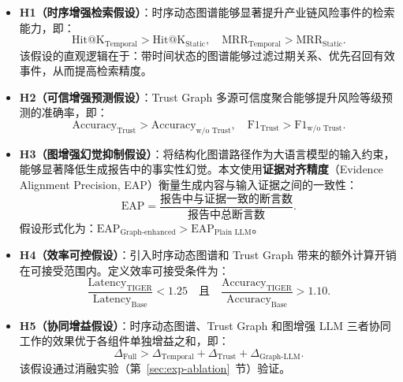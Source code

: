 \documentclass[12pt,a4paper]{article}
\newcommand{\term}[1]{\textbf{#1}}
\begin{document}
\begin{itemize}
    \item \term{H1（时序增强检索假设）}：时序动态图谱能够显著提升产业链风险事件的检索能力，即：
    \begin{equation}
    \text{Hit@K}_{\text{Temporal}} > \text{Hit@K}_{\text{Static}}, \quad \text{MRR}_{\text{Temporal}} > \text{MRR}_{\text{Static}}.
    \end{equation}
    该假设的直观逻辑在于：带时间状态的图谱能够过滤过期关系、优先召回有效事件，从而提高检索精度。

    \item \term{H2（可信增强预测假设）}：Trust Graph 多源可信度聚合能够提升风险等级预测的准确率，即：
    \begin{equation}
    \text{Accuracy}_{\text{Trust}} > \text{Accuracy}_{\text{w/o Trust}}, \quad \text{F1}_{\text{Trust}} > \text{F1}_{\text{w/o Trust}}.
    \end{equation}

    \item \term{H3（图增强幻觉抑制假设）}：将结构化图谱路径作为大语言模型的输入约束，能够显著降低生成报告中的事实性幻觉。本文使用\textbf{证据对齐精度}（Evidence Alignment Precision, EAP）衡量生成内容与输入证据之间的一致性：
    \begin{equation}
    \text{EAP} = \frac{\text{报告中与证据一致的断言数}}{\text{报告中总断言数}}.
    \end{equation}
    假设形式化为：$\text{EAP}_{\text{Graph-enhanced}} > \text{EAP}_{\text{Plain LLM}}$。

    \item \term{H4（效率可控假设）}：引入时序动态图谱和 Trust Graph 带来的额外计算开销在可接受范围内。定义效率可接受条件为：
    \begin{equation}
    \frac{\text{Latency}_{\text{TIGER}}}{\text{Latency}_{\text{Base}}} < 1.25 \quad \text{且} \quad \frac{\text{Accuracy}_{\text{TIGER}}}{\text{Accuracy}_{\text{Base}}} > 1.10.
    \end{equation}

    \item \term{H5（协同增益假设）}：时序动态图谱、Trust Graph 和图增强 LLM 三者协同工作的效果优于各组件单独增益之和，即：
    \begin{equation}
    \Delta_{\text{Full}} > \Delta_{\text{Temporal}} + \Delta_{\text{Trust}} + \Delta_{\text{Graph-LLM}}.
    \end{equation}
    该假设通过消融实验（第~\ref{sec:exp-ablation}~节）验证。
\end{itemize}
\end{document}
